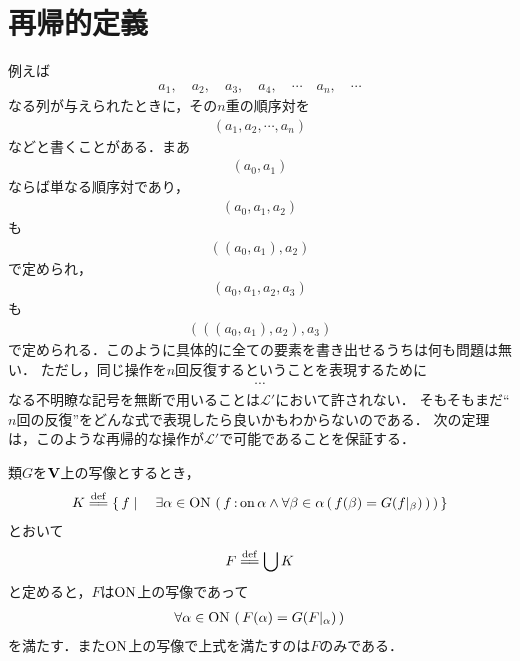 \section{再帰的定義}
\label{sec:recursive_definition}
	例えば
	\begin{align}
		a_1,\quad a_2,\quad a_3,\quad a_4,\quad \cdots\quad a_n,\quad \cdots
	\end{align}
	なる列が与えられたときに，その$n$重の順序対を
	\begin{align}
		(a_1,a_2,\cdots,a_n)
	\end{align}
	などと書くことがある．まあ
	\begin{align}
		(a_0,a_1)
	\end{align}
	ならば単なる順序対であり，
	\begin{align}
		(a_0,a_1,a_2)
	\end{align}
	も
	\begin{align}
		((a_0,a_1),a_2)
	\end{align}
	で定められ，
	\begin{align}
		(a_0,a_1,a_2,a_3)
	\end{align}
	も
	\begin{align}
		(((a_0,a_1),a_2),a_3)
	\end{align}
	で定められる．このように具体的に全ての要素を書き出せるうちは何も問題は無い．
	ただし，同じ操作を$n$回反復するということを表現するために
	\begin{align}
		\cdots
	\end{align}
	なる不明瞭な記号を無断で用いることは$\mathcal{L}'$において許されない．
	そもそもまだ``$n$回の反復''をどんな式で表現したら良いかもわからないのである．
	次の定理は，このような再帰的な操作が$\mathcal{L}'$で可能であることを保証する．
	
	\begin{screen}
		\begin{thm}[超限帰納法による写像の構成]
			類$G$を$\mathbf{V}$上の写像とするとき，
			\begin{align}
				K \defeq \Set{f}{\exists \alpha \in \ON\, \left(\, f \fon \alpha \wedge \forall \beta \in \alpha\, 
				(\, f(\beta) = G(f|_\beta)\, )\, \right)}
			\end{align}
			とおいて
			\begin{align}
				F \defeq \bigcup K
			\end{align}
			と定めると，$F$は$\mathrm{ON}$上の写像であって
			\begin{align}
				\forall \alpha \in \mathrm{ON}\, \left(\, F(\alpha) = G(F|_\alpha)\, \right)
			\end{align}
			を満たす．また$\mathrm{ON}$上の写像で上式を満たすのは$F$のみである．
		\end{thm}
	\end{screen}
	
